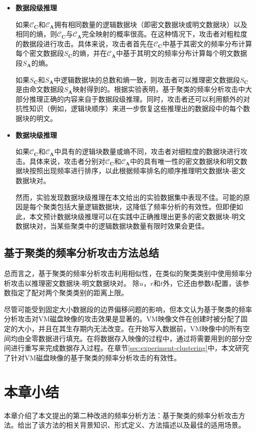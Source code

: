 \begin{itemize}
    \item \textbf{数据段级推理}
    
    \par 如果$\mathcal{C}_\mathbf{C}$和$\mathcal{C}_\mathbf{A}$拥有相同数量的逻辑数据块（即密文数据块或明文数据块）以及相同的熵，则$\mathcal{C}_\mathbf{C}$与$\mathcal{C}_\mathbf{A}$完全映射的概率很高。在这种情况下，攻击者对粗粒度的数据段进行攻击。具体来说，攻击者首先在$\mathcal{C}_\mathbf{C}$中基于其密文的频率分布计算每个密文数据段$S_\mathbf{C}$的熵，并在$\mathcal{C}_\mathbf{A}$中基于其明文的频率分布计算每个明文数据段$S_\mathbf{A}$的熵。
         
         
    \par 如果$S_\mathbf{C}$和$S_\mathbf{A}$中逻辑数据块的总数和熵一致，则攻击者可以推理密文数据段$S_\mathbf{C}$是由命文数据段$S_\mathbf{A}$映射得到的。根据实验表明，基于聚类的频率分析攻击中大部分推理正确的内容来自于数据段级推理。同时，攻击者还可以利用额外的对抗性知识（例如，逻辑块顺序）来进一步恢复这些推理出的数据段中的每个数据块的明文。
         
    \item \textbf{数据块级推理}
    
    
    \par 如果$\mathcal{C}_\mathbf{C}$和$\mathcal{C}_\mathbf{A}$中具有的逻辑块数量或熵不同，攻击者对细粒度的数据块进行攻击。具体来说，攻击者分别对$\mathcal{C}_\mathbf{C}$和$\mathcal{C}_\mathbf{A}$中的具有唯一性的密文数据块和明文数据块按照出现频率进行排序，以此根据频率排名的顺序推理明文数据块-密文数据块对。            
     
    \par 然而，实验发现数据块级推理在本文给出的实验数据集中表现不佳。可能的原因是每个聚类包括大量逻辑数据块，这降低了频率分析的有效性。但即便如此，本文预计数据块级推理可以在实践中正确推理出更多的密文数据块-明文数据块对，当某些聚类中的逻辑数据块数量有限时效果会更佳。
 
\end{itemize}

\subsection{基于聚类的频率分析攻击方法总结}

总而言之，基于聚类的频率分析攻击利用相似性，在类似的聚类类别中使用频率分析攻击以推理密文数据块-明文数据块对。 除$u$，$r$和$t$外，它还由参数$k$配置，该参数指定了配对两个聚类类别的距离上限。

尽管可能受到固定大小数据段的边界偏移问题的影响，但本文认为基于聚类的频率分析攻击对VM磁盘映像的攻击效果是显著的。VM映像文件在创建时被分配了固定的大小，并且在其生存期内无法改变。在开始写入数据前，VM映像中的所有空间均由全零数据进行填充。在将数据存入映像的过程中，通过将需要用到的部分空间进行重写来完成数据存入过程。在章节\ref{sec:experiment-clustering}中，本文研究了针对VM磁盘映像的基于聚类的频率分析攻击的有效性。

\section{本章小结}

本章介绍了本文提出的第二种改进的频率分析方法：基于聚类的频率分析攻击方法。给出了该方法的相关背景知识、形式定义、方法描述以及最佳的适用场景。                  



